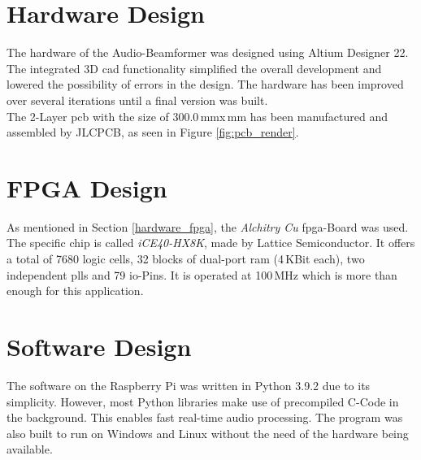 \newpage
\section{Hardware Design}
The hardware of the Audio-Beamformer was designed using Altium Designer 22. The integrated 3D \acrshort{cad} functionality simplified the overall development and lowered the possibility of errors in the design.
The hardware has been improved over several iterations until a final version was built.\\
The 2-Layer \acrfull{pcb} with the size of 300.0\,mm\;x\,mm has been manufactured and assembled by JLCPCB, as seen in Figure \ref{fig:pcb_render}.



\newpage
\section{FPGA Design}
As mentioned in Section \ref{hardware_fpga}, the \textit{Alchitry Cu} \acrshort{fpga}-Board was used. The specific chip is called \textit{iCE40-HX8K}, made by Lattice Semiconductor. It offers a total of 7680 logic cells, 32 blocks of dual-port \acrshort{ram} (4\,KBit each), two independent \acrshort{pll}s and 79 \acrshort{io}-Pins. It is operated at 100\,MHz which is more than enough for this application.


\newpage
\section{Software Design}
The software on the Raspberry Pi was written in Python 3.9.2 due to its simplicity. However, most Python libraries make use of precompiled C-Code in the background. This enables fast real-time audio processing.
The program was also built to run on Windows and Linux without the need of the hardware being available.




